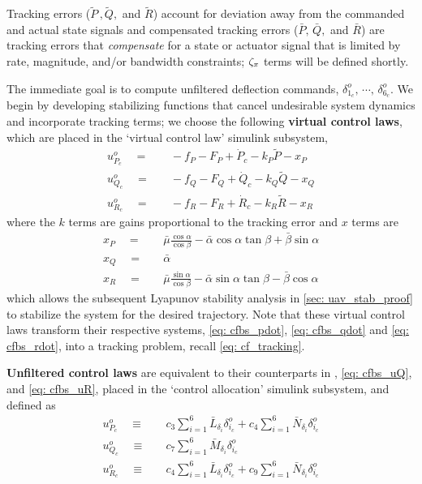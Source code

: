 \documentclass[12pt]{ucthesis}
\begin{document}
Tracking errors ($\tilde{P}\,,\tilde{Q},$ and $\tilde{R}$) account for deviation away from the commanded and actual state signals and compensated tracking errors ($\bar{P},\,\bar{Q},$ and $\bar{R}$) are tracking errors that \textit{compensate} for a state or actuator signal that is limited by rate, magnitude, and/or bandwidth constraints; $\zeta_x$ terms will be defined shortly.

The immediate goal is to compute unfiltered deflection commands, $\delta^{o}_{1_c},\,\cdots,\,\delta^{o}_{6_c}$. We begin by developing stabilizing functions that cancel undesirable system dynamics and incorporate tracking terms; we choose the following \textbf{virtual control laws}, which are placed in the `virtual control law' simulink subsystem,
	\begin{align}
		\label{eq: cfbs_virt_p}	u^{o}_{P_c} \quad =& \quad -f_{P} -F_{P} +\dot{P}_c -k_{P}\tilde{P} - x_P \\
		\label{eq: cfbs_virt_q}	u^{o}_{Q_c} \quad =& \quad -f_{Q} -F_{Q} +\dot{Q}_c -k_{Q}\tilde{Q} - x_Q \\
		\label{eq: cfbs_virt_r}	u^{o}_{R_c} \quad =& \quad -f_{R} -F_{R} +\dot{R}_c -k_{R}\tilde{R} - x_R
	\end{align}
where the $k$ terms are gains proportional to the tracking error and $x$ terms are
	\begin{align}
		x_P \quad=&\quad \bar{\mu}\frac{\cos\alpha}{\cos\beta} - \bar{\alpha}\cos\alpha\tan\beta + \bar{\beta}\sin\alpha \\
		x_Q \quad=&\quad \bar{\alpha} \\
		x_R \quad=&\quad \bar{\mu}\frac{\sin\alpha}{\cos\beta} - \bar{\alpha}\sin\alpha\tan\beta - \bar{\beta}\cos\alpha
	\end{align}
which allows the subsequent Lyapunov stability analysis in \autoref{sec: uav_stab_proof} to stabilize the system for the desired trajectory. Note that these virtual control laws transform their respective systems, \ref{eq: cfbs_pdot}, \ref{eq: cfbs_qdot} and \ref{eq: cfbs_rdot}, into a tracking problem, recall \autoref{eq: cf_tracking}.

\textbf{Unfiltered control laws} are equivalent to their counterparts in , \ref{eq: cfbs_uQ}, and \ref{eq: cfbs_uR}, placed in the `control allocation' simulink subsystem, and defined as
	\begin{align}
		\label{eq: cfbs_ctrl_o_p}	u^{o}_{P_c} \quad \equiv& \quad c_3 \sum\limits_{i=1}^6 \bar{L}_{\delta_{i}} \delta^{o}_{i_c} + c_4 \sum\limits_{i=1}^6 \bar{N}_{\delta_{i}} \delta^{o}_{i_c}\\
		\label{eq: cfbs_ctrl_o_q}	u^{o}_{Q_c} \quad \equiv& \quad c_7 \sum\limits_{i=1}^6 \bar{M}_{\delta_{i}} \delta^{o}_{i_c}\\
		\label{eq: cfbs_ctrl_o_r}	u^{o}_{R_c} \quad \equiv& \quad c_4 \sum\limits_{i=1}^6 \bar{L}_{\delta_{i}} \delta^{o}_{i_c} + c_9 \sum\limits_{i=1}^6 \bar{N}_{\delta_{i}} \delta^{o}_{i_c}
	\end{align}
\end{document}
